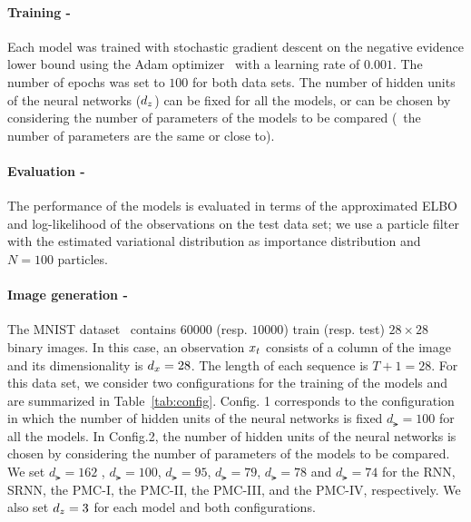 \paragraph{Training - }
Each model was trained with stochastic gradient descent on the negative evidence 
lower bound using the Adam optimizer~\citep{kingma2014adam} with 
a learning rate of $0.001$.
The number of epochs was set to $100$ for both data sets.
The number of hidden units of the neural networks ($d_z$) can be fixed for all the models,
or can be chosen by considering the number of parameters of the models to be compared
(\ie~the number of parameters are the same or close to). 

\paragraph{Evaluation - } 
The  performance of the models is evaluated in terms of the approximated ELBO
and log-likelihood of the observations on the test data set; 
we use a particle filter with the estimated variational distribution 
as importance distribution and $N=100$ particles.



\paragraph{Image generation - }
The MNIST dataset~\citep{lecun1998mnist} contains  $60000$ (resp. $10000$) train (resp. test) 
$28 \times 28$  binary images. In this case, 
an observation $x_t$ consists of a column of the image
and its dimensionality is $d_x=28$. The length of each sequence is $T+1=28$.
For this data set, we consider two configurations for the training of the models and are
summarized in Table~\ref{tab:config}. Config. 1 corresponds to the configuration
in which the number of hidden units of the neural networks is fixed $d_\lat=100$ for all the models. 
In Config.2, the number of hidden units of the neural networks
is chosen by considering the number of parameters of the models to be compared. 
We set $d_\lat=162$ , $d_\lat=100$, $d_\lat=95$, $d_\lat=79$, $d_\lat=78$ and 
$d_\lat=74$  for the RNN, SRNN, the
PMC-I, the PMC-II, the PMC-III, and the PMC-IV, respectively.  
We also set $d_z=3$ for each model and both configurations.

